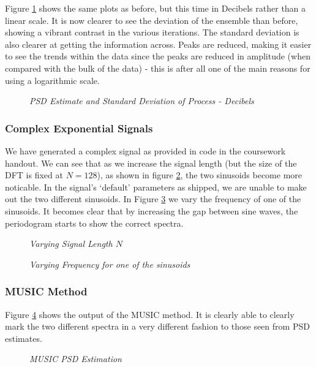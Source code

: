 \documentclass[./main.tex]{subfiles}
\begin{document}
Figure \ref{fig:2_1_c} shows the same plots as before, but this time in Decibels rather than a linear scale. It is now clearer to see the deviation of the ensemble than before, showing a vibrant contrast in the various iterations. The standard deviation is also clearer at getting the information across. Peaks are reduced, making it easier to see the trends within the data since the peaks are reduced in amplitude (when compared with the bulk of the data) - this is after all one of the main reasons for using a logarithmic scale.

\begin{figure}[h]
	\centering 
	\resizebox{\textwidth}{!}{}
	\caption{\textit{PSD Estimate and Standard Deviation of Process - Decibels}}
	\label{fig:2_1_c}
\end{figure}


\subsubsection{Complex Exponential Signals}
We have generated a complex signal as provided in code in the coursework handout. We can see that as we increase the signal length (but the size of the DFT is fixed at $N=128$), as shown in figure \ref{fig:2_1_d_N}, the two sinusoids become more noticable. In the signal's `default' parameters as shipped, we are unable to make out the two different sinusoids. In Figure \ref{fig:2_1_d_freq} we vary the frequency of one of the sinusoids. It becomes clear that by increasing the gap between sine waves, the periodogram starts to show the correct spectra.


\begin{figure}[h]
	\centering 
	\resizebox{\textwidth}{!}{}
	\caption{\textit{Varying Signal Length $N$}}
	\label{fig:2_1_d_N}
\end{figure}

\begin{figure}[h]
	\centering 
	\resizebox{\textwidth}{!}{}
	\caption{\textit{Varying Frequency for one of the sinusoids}}
	\label{fig:2_1_d_freq}
\end{figure}


\subsubsection{MUSIC Method}

Figure \ref{fig:2_1_e} shows the output of the MUSIC method. It is clearly able to clearly mark the two different spectra in a very different fashion to those seen from PSD estimates.

\begin{figure}[h]
	\centering 
	\resizebox{0.6\textwidth}{!}{}
	\caption{\textit{MUSIC PSD Estimation}}
	\label{fig:2_1_e}
\end{figure}
\end{document}
